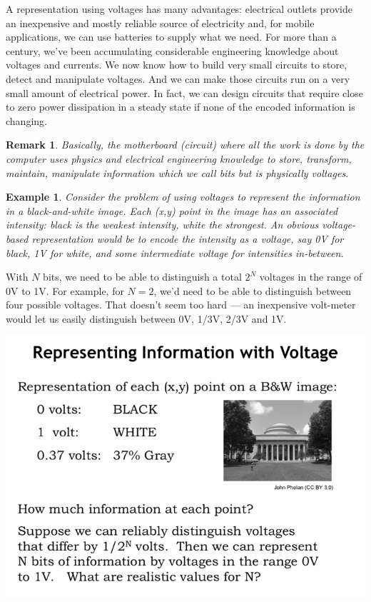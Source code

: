 \documentclass[a4paper,twoside]{article}
\newtheorem{example}[theorem]{Example}
\newtheorem{remark}[theorem]{Remark}
\numberwithin{equation}{section}
\begin{document}
A representation using voltages has many advantages: electrical outlets provide an inexpensive and
mostly reliable source of electricity and, for mobile applications, we can use batteries to supply
what we need. For more than a century, we've been accumulating considerable engineering knowledge
about voltages and currents. We now know how to build very small circuits to store, detect and manipulate
 voltages. And we can make those circuits run on a very small amount of electrical power. In fact, we can design circuits that require close to zero power dissipation in a steady state if none of the encoded information is changing.
\begin{remark}
    Basically, the motherboard (circuit) where all the work is done by the computer uses physics and
    electrical engineering knowledge to store, transform, maintain, manipulate information which we
    call bits but is physically voltages.
\end{remark}
\begin{example}
    Consider the problem of using voltages to represent the information in a black-and-white image.
    Each (x,y) point in the image has an associated intensity: black is the weakest intensity, white
     the strongest. An obvious voltage-based representation would be to encode the intensity as a voltage,
      say 0V for black, 1V for white, and some intermediate voltage for intensities in-between.
\end{example}
With $N$ bits, we need to be able to distinguish a total $2^N$ voltages in the range of 0V to 1V.
For example, for $N = 2$, we'd need to be able to distinguish between four possible voltages. That
 doesn't seem too hard — an inexpensive volt-meter would let us easily distinguish between 0V, 1/3V,
  2/3V and 1V.
\begin{center}
    \includegraphics[scale=0.4]{assets/info_voltage.png}
\end{center}
\end{document}
